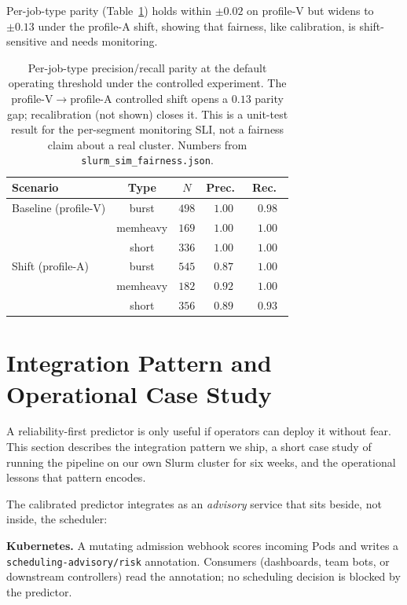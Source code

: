 \documentclass[conference]{IEEEtran}
\begin{document}
Per-job-type parity (Table~\ref{tab:fairness}) holds within $\pm 0.02$ on profile-V but widens to $\pm 0.13$ under the profile-A shift, showing that fairness, like calibration, is shift-sensitive and needs monitoring.

\begin{table}[!htbp]
\caption{Per-job-type precision/recall parity at the default operating threshold under the controlled experiment. The profile-V$\to$profile-A controlled shift opens a $0.13$ parity gap; recalibration (not shown) closes it. This is a unit-test result for the per-segment monitoring SLI, not a fairness claim about a real cluster. Numbers from \texttt{slurm\_sim\_fairness.json}.}
\label{tab:fairness}
\centering
\small
\begin{tabular}{lcccc}
\toprule
Scenario & Type & $N$ & Prec.\ & Rec.\ \\
\midrule
Baseline (profile-V) & burst     & $498$ & $1.00$ & $0.98$ \\
                     & memheavy  & $169$ & $1.00$ & $1.00$ \\
                     & short     & $336$ & $1.00$ & $1.00$ \\
Shift (profile-A)    & burst     & $545$ & $0.87$ & $1.00$ \\
                     & memheavy  & $182$ & $0.92$ & $1.00$ \\
                     & short     & $356$ & $0.89$ & $0.93$ \\
\bottomrule
\end{tabular}
\end{table}

\section{Integration Pattern and Operational Case Study}
\label{sec:ops}
A reliability-first predictor is only useful if operators can deploy it without fear. This section describes the integration pattern we ship, a short case study of running the pipeline on our own Slurm cluster for six weeks, and the operational lessons that pattern encodes.

The calibrated predictor integrates as an \emph{advisory} service that sits beside, not inside, the scheduler:

\textbf{Kubernetes.} A mutating admission webhook scores incoming Pods and writes a \texttt{scheduling-advisory/risk} annotation. Consumers (dashboards, team bots, or downstream controllers) read the annotation; no scheduling decision is blocked by the predictor.
\end{document}
